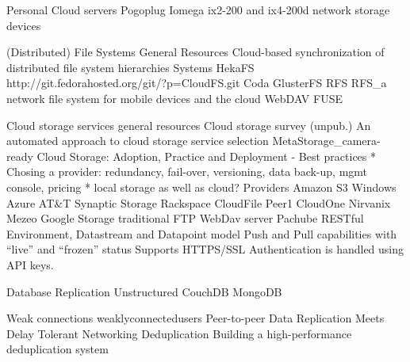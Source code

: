 		Personal Cloud servers		
			Pogoplug
			Iomega
				ix2-200 and ix4-200d network storage devices

	(Distributed) File Systems
		General Resources
			Cloud-based synchronization of distributed file system hierarchies
		Systems
			HekaFS
			http://git.fedorahosted.org/git/?p=CloudFS.git 
			Coda
			GlusterFS
			RFS
				RFS_a network file system for mobile devices and the cloud
		WebDAV 
		FUSE		

	Cloud storage services
		general resources
			Cloud storage survey (unpub.)
			An automated approach to cloud storage service selection
			MetaStorage_camera-ready
			Cloud Storage: Adoption, Practice and Deployment
				- Best practices
					* Chosing a provider: redundancy, fail-over, versioning, data back-up, mgmt console, pricing
					* local storage as well as cloud?
		Providers
			Amazon S3
			Windows Azure
			AT&T Synaptic Storage
			Rackspace CloudFile
			Peer1 CloudOne
			Nirvanix
			Mezeo
			Google Storage
			traditional FTP
			WebDav server
			Pachube
				RESTful
				Environment, Datastream and Datapoint model
				Push and Pull capabilities with ``live'' and ``frozen'' status
				Supports HTTPS/SSL
				Authentication is handled using API keys.


	Database Replication
		Unstructured
			CouchDB
			MongoDB

	Weak connections
		weaklyconnectedusers
		Peer-to-peer Data Replication Meets Delay Tolerant Networking
	Deduplication
		Building a high-performance deduplication system